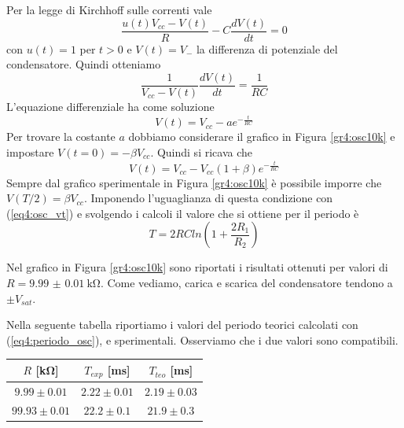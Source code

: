 Per la legge di Kirchhoff sulle correnti vale
$$\frac{u(t)V_{cc} - V(t)}{R} - C \frac{dV(t)}{dt} = 0$$
con $u(t)=1$ per $t>0$ e $V(t)=V_-$ la differenza di potenziale del condensatore. Quindi otteniamo
$$\frac{1}{V_{cc} - V(t)} \frac{dV(t)}{dt} = \frac{1}{RC}$$
L'equazione differenziale ha come soluzione
$$V(t)=V_{cc} - a e^{-\frac{t}{RC}}$$
Per trovare la costante $a$ dobbiamo considerare il grafico in Figura \ref{gr4:osc10k} e impostare $V(t=0)=-\beta V_{cc}$. Quindi si ricava che
\begin{equation}
V(t)=V_{cc} - V_{cc} (1+ \beta) e^{-\frac{t}{RC}}
\label{eq4:osc_vt}
\end{equation}
Sempre dal grafico sperimentale in Figura \ref{gr4:osc10k} è possibile imporre che $V(T/2)=\beta V_{cc}$. Imponendo l'uguaglianza di questa condizione con (\ref{eq4:osc_vt}) e svolgendo i calcoli il valore che si ottiene per il periodo è
\begin{equation}
T=2RCln\left(1+\frac{2R_1}{R_2}\right)
\label{eq4:periodo_osc}
\end{equation}  

Nel grafico in Figura \ref{gr4:osc10k} sono riportati i risultati ottenuti per valori di $R=\SI{9.99(1)}{\kohm}$. Come vediamo, carica e scarica del condensatore tendono a $\pm V_{sat}$.

Nella seguente tabella riportiamo i valori del periodo teorici calcolati con (\ref{eq4:periodo_osc}), e sperimentali. Osserviamo che i due valori sono compatibili.

\begin{center}
{\renewcommand{\arraystretch}{1.2}%
	\begin{tabular}{c|c|c}
	$R$ [\si{\kilo\ohm}] & $T_{exp}$ [\si{\milli\second}] & $T_{teo}$ [\si{\milli\second}]\\
    \hline
	$9.99\pm0.01 $ & $2.22\pm0.01$ & $2.19 \pm 0.03$\\
    \hline
	$99.93\pm0.01 $ & $22.2\pm0.1$ & $21.9 \pm 0.3$\\
	\end{tabular}
}
\end{center}

